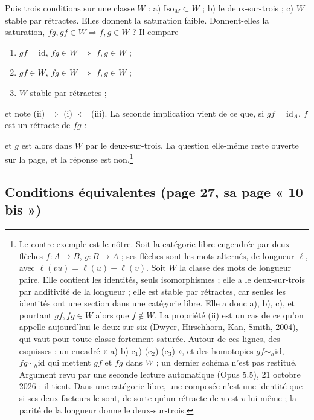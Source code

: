 \documentclass[11pt,a4paper]{article}
\begin{document}
Puis trois conditions sur une classe $W$ : a) $\mathrm{Iso}_M \subset W$ ; b)
le deux-sur-trois ; c) $W$ stable par rétractes. Elles donnent la saturation
faible. Donnent-elles la saturation, $fg, gf \in W \Rightarrow f, g \in W$ ?
Il compare
\begin{enumerate}
\item[(i)] $gf = \mathrm{id}$, $fg \in W$ $\Rightarrow$ $f, g \in W$ ;
\item[(ii)] $gf \in W$, $fg \in W$ $\Rightarrow$ $f, g \in W$ ;
\item[(iii)] $W$ stable par rétractes ;
\end{enumerate}
et note (ii) $\Rightarrow$ (i) $\Leftarrow$ (iii). La seconde implication
vient de ce que, si $gf = \mathrm{id}_A$, $f$ est un rétracte de $fg$ :


et $g$ est alors dans $W$ par le deux-sur-trois. La question elle-même reste
ouverte sur la page, et la réponse est non.\footnote{Le contre-exemple est le
nôtre. Soit la catégorie libre engendrée par deux flèches $f : A \to B$,
$g : B \to A$ ; ses flèches sont les mots alternés, de longueur $\ell$, avec
$\ell(vu) = \ell(u) + \ell(v)$. Soit $W$ la classe des mots de longueur paire.
Elle contient les identités, seuls isomorphismes ; elle a le deux-sur-trois par
additivité de la longueur ; elle est stable par rétractes, car seules les
identités ont une section dans une catégorie libre. Elle a donc a), b), c), et
pourtant $gf, fg \in W$ alors que $f \notin W$. La propriété (ii) est un cas de
ce qu'on appelle aujourd'hui le deux-sur-six (Dwyer, Hirschhorn, Kan, Smith,
2004), qui vaut pour toute classe fortement saturée. Autour de ces lignes, des
esquisses : un encadré « a) b) c$_1$) (c$_2$) (c$_3$) », et des homotopies
$gf \sim_h \mathrm{id}$, $fg \sim_h \mathrm{id}$ qui mettent $gf$ et $fg$ dans
$W$ ; un dernier schéma n'est pas restitué. Argument revu par une seconde lecture automatique (Opus 5.5), 21 octobre 2026 : il tient. Dans une catégorie libre, une composée n'est une identité que si ses deux facteurs le sont, de sorte qu'un rétracte de $v$ est $v$ lui-même ; la parité de la longueur donne le deux-sur-trois.}

\subsection*{Conditions équivalentes (page 27, sa page « 10 bis »)}
\end{document}
